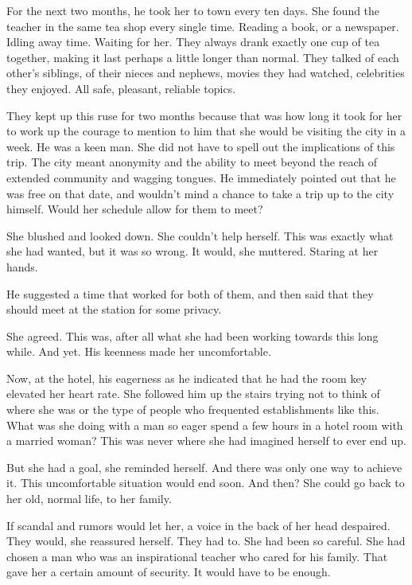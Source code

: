 \documentclass{article}
\begin{document}
For the next two months, he took her to town every ten days. She found the teacher in the same tea shop every single time. Reading a book, or a newspaper. Idling away time. Waiting for her. They always drank exactly one cup of tea together, making it last perhaps a little longer than normal. They talked of each other's siblings, of their nieces and nephews, movies they had watched, celebrities they enjoyed. All safe, pleasant, reliable topics. 

They kept up this ruse for two months because that was how long it took for her to work up the courage to mention to him that she would be visiting the city in a week. He was a keen man. She did not have to spell out the implications of this trip. The city meant anonymity and the ability to meet beyond the reach of extended community and wagging tongues. He immediately pointed out that he was free on that date, and wouldn't mind a chance to take a trip up to the city himself. Would her schedule allow for them to meet? 

She blushed and looked down. She couldn't help herself. This was exactly what she had wanted, but it was so wrong. It would, she muttered. Staring at her hands.

He suggested a time that worked for both of them, and then said that they should meet at the station for some privacy. 

She agreed. This was, after all what she had been working towards this long while. And yet. His keenness made her uncomfortable.  

Now, at the hotel, his eagerness as he indicated that he had the room key elevated her heart rate. She followed him up the stairs trying not to think of where she was or the type of people who frequented establishments like this. What was she doing with a man so eager spend a few hours in a hotel room with a married woman? This was never where she had imagined herself to ever end up. 

But she had a goal, she reminded herself. And there was only one way to achieve it. This uncomfortable situation would end soon. And then? She could go back to her old, normal life, to her family. 

If scandal and rumors would let her, a voice in the back of her head despaired. They would, she reassured herself. They had to. She had been so careful. She had chosen a man who was an inspirational teacher who cared for his family. That gave her a certain amount of security. It would have to be enough.
\end{document}
